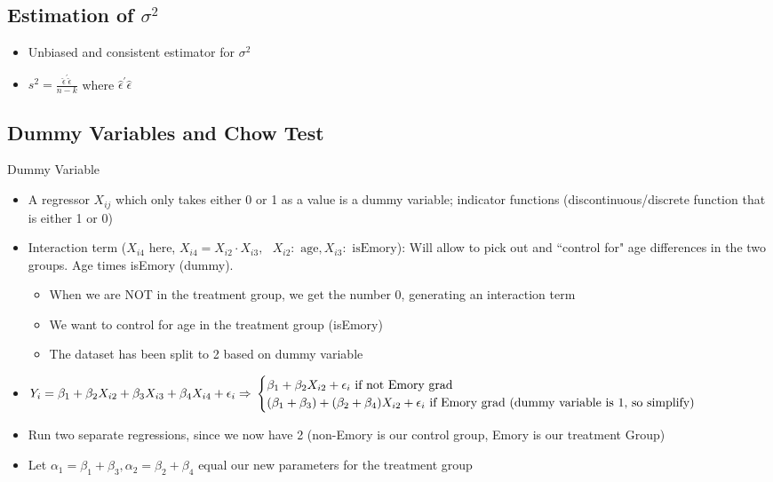 \documentclass[10pt, oneside]{article}
\begin{document}
\subsection{Estimation of $\sigma^2$}
\begin{itemize}
    \item Unbiased and consistent estimator for $\sigma^2$
    \item $s^2 = \frac{\hat \epsilon ^\prime \hat \epsilon}{n-k}$ where $\hat \epsilon^\prime \hat \epsilon$
\end{itemize}

\subsection{Dummy Variables and Chow Test}
Dummy Variable
\begin{itemize}
    \item A regressor $X_{ij}$ which only takes either 0 or 1 as a value is a dummy variable; indicator functions (discontinuous/discrete function that is either 1 or 0)
    \item Interaction term ($X_{i4}$ here, $X_{i4} = X_{i2} \cdot X_{i3} , \text{ 
 } X_{i2}:\text{ age}, X_{i3}: \text{ isEmory}$): Will allow to pick out and ``control for" age differences in the two groups. Age times isEmory (dummy).
    \begin{itemize}
        \item When we are NOT in the treatment group, we get the number 0, generating an interaction term
        \item We want to control for age in the treatment group (isEmory)
        \item The dataset has been split to 2 based on dummy variable
    \end{itemize}
    \item $Y_i = \beta_1 + \beta_2 X_{i2} + \beta_3 X_{i3} + \beta_4 X_{i4} + \epsilon_i \Rightarrow  \\\begin{cases}
        \beta_1 + \beta_2 X_{i2} + \epsilon_i \text{ if not Emory grad}\\
        (\beta_1 + \beta_3 ) + (\beta_2 + \beta_4) X_{i2} + \epsilon_i \text{ if Emory grad (dummy variable is 1, so simplify)}
    \end{cases}$
    \item Run two separate regressions, since we now have 2 (non-Emory is our control group, Emory is our treatment Group)
    \item Let $\alpha_1 = \beta_1 + \beta_3,\alpha_2 = \beta_2 + \beta_4$ equal our new parameters for the treatment group

\end{itemize}
\end{document}
